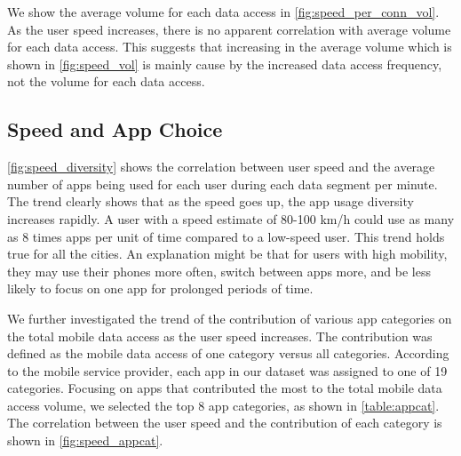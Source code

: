 We show the average volume for each data access in \autoref{fig:speed_per_conn_vol}. As the user speed increases, there is no apparent correlation with average volume for each data access. This suggests that increasing in the average volume which is shown in \autoref{fig:speed_vol} is mainly cause by the increased data access frequency, not the volume for each data access.

\subsection{Speed and App Choice}


\autoref{fig:speed_diversity} shows the correlation between user speed and the average number of apps being used for each user during each data segment per minute.
The trend clearly shows that as the speed goes up, the app usage diversity increases rapidly.
A user with a speed estimate of 80-100 km/h could use as many as 8 times apps per unit of time compared to a low-speed user.
This trend holds true for all the cities. An explanation might be that for users with high mobility, they may use their phones more often, switch between apps more, and be less likely to focus on one app for prolonged periods of time. 


We further investigated the trend of the contribution of various app categories on the total mobile data access as the user speed increases.
The contribution was defined as the mobile data access of one category versus all categories.
According to the mobile service provider, each app in our dataset was assigned to one of 19 categories.
Focusing on apps that contributed the most to the total mobile data access volume,
we selected the top 8 app categories, as shown in \autoref{table:appcat}.
The correlation between the user speed and the contribution of each category is shown in \autoref{fig:speed_appcat}.

